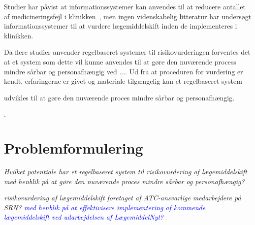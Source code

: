 Studier har påvist at informationssystemer kan anvendes til at reducere antallet af medicineringsfejl i klinikken~\citep{Agrawal2009, Stenner2010, Fischer2008, Simpson2008}, men ingen videnskabelig litteratur har undersøgt informationssystemer til at vurdere lægemiddelskift inden de implementeres i klinikken. 


Da flere studier anvender regelbaseret systemer til risikovurderingen forventes det at et system som dette vil kunne anvendes til at gøre den nuværende process mindre sårbar og personafhængig ved ....
Ud fra at proceduren for vurdering er kendt, erfaringerne er givet og materiale tilgængelig kan et regelbaseret system 

udvikles til at gøre den nuværende proces mindre sårbar og personafhængig.

. %


\section{Problemformulering}
\textit{Hvilket potentiale har et regelbaseret system til risikovurdering af lægemiddelskift med henblik på at gøre den nuværende proces mindre sårbar og personafhængig?}

\textit{risikovurdering af lægemiddelskift foretaget af ATC-ansvarlige medarbejdere på SRN? \textcolor{blue}{med henblik på at effektivisere implementering af kommende lægemiddelskift ved udarbejdelsen af LægemiddelNyt?} }



